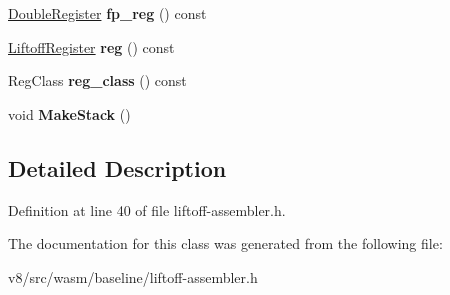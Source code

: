 \begin{DoxyCompactItemize}
\mbox{\label{classv8_1_1internal_1_1wasm_1_1LiftoffAssembler_1_1VarState_a6d19ba3c835785af9a880526f2386731}} 
\mbox{\hyperlink{classv8_1_1internal_1_1DoubleRegister}{Double\+Register}} {\bfseries fp\+\_\+reg} () const
\item 
\mbox{\label{classv8_1_1internal_1_1wasm_1_1LiftoffAssembler_1_1VarState_a87d27708c8bb954a3f837727a55f2795}} 
\mbox{\hyperlink{classv8_1_1internal_1_1wasm_1_1LiftoffRegister}{Liftoff\+Register}} {\bfseries reg} () const
\item 
\mbox{\label{classv8_1_1internal_1_1wasm_1_1LiftoffAssembler_1_1VarState_a733acf3f74318d3037516208d0b0c81f}} 
Reg\+Class {\bfseries reg\+\_\+class} () const
\item 
\mbox{\label{classv8_1_1internal_1_1wasm_1_1LiftoffAssembler_1_1VarState_ab82cc6a5a89b12afcfcea190dede37b0}} 
void {\bfseries Make\+Stack} ()
\end{DoxyCompactItemize}


\subsection{Detailed Description}


Definition at line 40 of file liftoff-\/assembler.\+h.



The documentation for this class was generated from the following file\+:\begin{DoxyCompactItemize}
\item 
v8/src/wasm/baseline/liftoff-\/assembler.\+h\end{DoxyCompactItemize}
